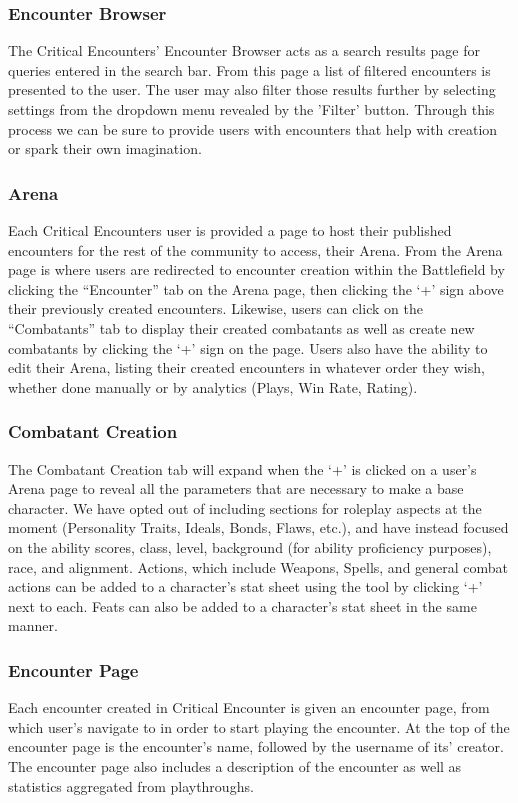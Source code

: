 \documentclass[letterpaper, 10 pt, conference]{ieeeconf}
\begin{document}
\subsubsection{Encounter Browser}
The Critical Encounters’ Encounter Browser acts as a search results
page for queries entered in the search bar. From this page a list of filtered
encounters is presented to the user. The user may also filter those results further
by selecting settings from the dropdown menu revealed by the ’Filter’ button.
Through this process we can be sure to provide users with encounters that help
with creation or spark their own imagination.
\subsubsection{Arena}
Each Critical Encounters user is provided a page to host their published encounters
for the rest of the community to access, their Arena. From the Arena
page is where users are redirected to encounter creation within the
Battlefield by clicking the “Encounter” tab on the Arena page, then clicking the
‘+’ sign above their previously created encounters. Likewise, users can click on
the “Combatants” tab to display their created combatants as well as create new
combatants by clicking the ‘+’ sign on the page. Users also have the ability to edit
their Arena, listing their created encounters in whatever order they wish, whether
done manually or by analytics (Plays, Win Rate, Rating).
\subsubsection{Combatant Creation}
The Combatant Creation tab will expand when the ‘+’ is clicked on a
user’s Arena page to reveal all the parameters that are necessary to make a base
character. We have opted out of including sections for roleplay aspects at the
moment (Personality Traits, Ideals, Bonds, Flaws, etc.), and have instead focused
on the ability scores, class, level, background (for ability proficiency purposes),
race, and alignment. Actions, which include Weapons, Spells, and general combat
actions can be added to a character’s stat sheet using the tool by clicking ‘+’ next
to each. Feats can also be added to a character’s stat sheet in the same manner.
\subsubsection{Encounter Page}
Each encounter created in Critical Encounter is given an encounter page, from
which user’s navigate to in order to start playing the encounter. At the top of the
encounter page is the encounter’s name, followed by the username of its’ creator. The encounter page also includes a description of the encounter as well as statistics aggregated from playthroughs.
\end{document}
